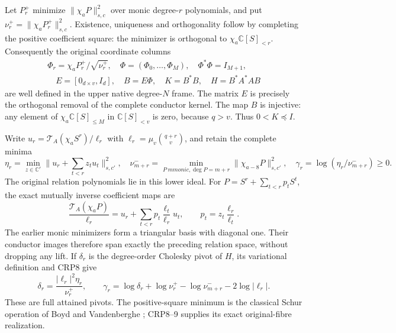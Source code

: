 Let $P_r^+$ minimize $\|\chi_aP\|_{s,c}^2$ over monic degree-$r$
polynomials, and put $\nu_r^+=\|\chi_aP_r^+\|_{s,c}^2$.
Existence, uniqueness and orthogonality follow by completing the
positive coefficient square: the minimizer is orthogonal to
$\chi_a\mathbb C[S]_{<r}$. Consequently the original coordinate
columns
\[
\begin{gathered}
\Phi_r=\chi_aP_r^+/\sqrt{\nu_r^+},\quad
\Phi=(\Phi_0,\ldots,\Phi_M),\quad\Phi^*\Phi=I_{M+1},\\
\quad E=[0_{d\times v},I_d],\quad B=E\Phi,
\quad K=B^*B,\quad H=B^*A^*AB
\end{gathered}\tag{CRP6}
\]
are well defined in the upper native degree-$N$ frame. The matrix $E$
is precisely the orthogonal removal of the complete conductor kernel.
The map $B$ is injective: any element of $\chi_a\mathbb C[S]_{\le M}$
in $\mathbb C[S]_{<v}$ is zero, because $q>v$. Thus $0<K\preceq I$.

Write $u_r=\mathcal T_A(\chi_aS^r)/\ell_r$ with
$\ell_r=\mu_v\binom{q+r}{v}$, and retain the complete minima
\[
\eta_r=\min_{z\in\mathbb C^r}\|u_r+\sum_{t<r}z_tu_t\|_{s,c'}^2,
\quad\nu^-_{m+r}=\min_{P\ {
m monic},\deg P=m+r}
 \|\chi_{a-8}P\|_{s,c'}^2,
\quad\gamma_r=\log(\eta_r/\nu^-_{m+r})\ge0.\tag{CRP7}
\]
The original relation polynomials lie in this lower ideal. For
$P=S^r+\sum_{t<r}p_tS^t$, the exact mutually inverse coefficient maps are
\[
\frac{\mathcal T_A(\chi_aP)}{\ell_r}
 =u_r+\sum_{t<r}p_t\frac{\ell_t}{\ell_r}u_t,
\qquad p_t=z_t\frac{\ell_r}{\ell_t}.\tag{CRP8}
\]
The earlier monic minimizers form a triangular basis with diagonal one.
Their conductor images therefore span exactly the preceding relation
space, without dropping any lift. If $\delta_r$ is the degree-order
Cholesky pivot of $H$, its variational definition and CRP8 give
\[
\boxed{\delta_r=\frac{|\ell_r|^2\eta_r}{\nu_r^+},\qquad
\gamma_r=\log\delta_r+\log\nu_r^+-\log\nu^-_{m+r}
                         -2\log|\ell_r|.}\tag{CRP9}
\]
These are full attained pivots. The positive-square minimum is the
classical Schur operation of Boyd and Vandenberghe
\cite[Appendix A.5.5, p.~650]{human:boyd-vandenberghe}; CRP8--9 supplies
its exact original-fibre realization.

